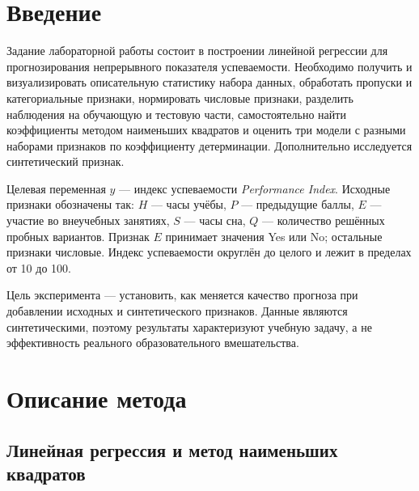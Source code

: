 \section{Введение}

Задание лабораторной работы состоит в построении линейной регрессии для
прогнозирования непрерывного показателя успеваемости. Необходимо получить и
визуализировать описательную статистику набора данных, обработать пропуски и
категориальные признаки, нормировать числовые признаки, разделить наблюдения
на обучающую и тестовую части, самостоятельно найти коэффициенты методом
наименьших квадратов и оценить три модели с разными наборами признаков по
коэффициенту детерминации. Дополнительно исследуется синтетический признак.

Целевая переменная $y$ --- индекс успеваемости \textit{Performance Index}.
Исходные признаки обозначены так: $H$ --- часы учёбы, $P$ --- предыдущие
баллы, $E$ --- участие во внеучебных занятиях, $S$ --- часы сна, $Q$ ---
количество решённых пробных вариантов. Признак $E$ принимает значения
Yes или No; остальные признаки числовые. Индекс успеваемости округлён
до целого и лежит в пределах от 10 до 100.

Цель эксперимента --- установить, как меняется качество прогноза при
добавлении исходных и синтетического признаков. Данные являются
синтетическими, поэтому результаты характеризуют учебную задачу, а не
эффективность реального образовательного вмешательства.

\section{Описание метода}

\subsection{Линейная регрессия и метод наименьших квадратов}


